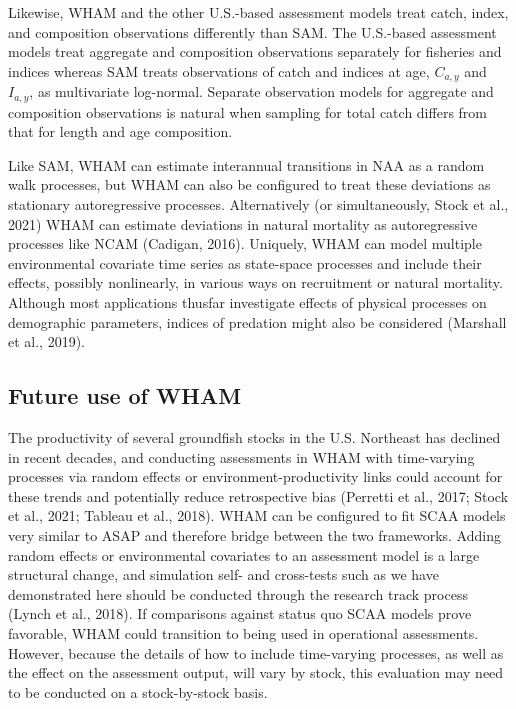 \documentclass[]{article}
\begin{document}
Likewise, WHAM and the other U.S.-based assessment models treat catch,
index, and composition observations differently than SAM. The U.S.-based
assessment models treat aggregate and composition observations
separately for fisheries and indices whereas SAM treats observations of
catch and indices at age, \(C_{a,y}\) and \(I_{a,y}\), as multivariate
log-normal. Separate observation models for aggregate and composition
observations is natural when sampling for total catch differs from that
for length and age composition.

Like SAM, WHAM can estimate interannual transitions in NAA as a random
walk processes, but WHAM can also be configured to treat these
deviations as stationary autoregressive processes. Alternatively (or
simultaneously, Stock et al., 2021) WHAM can estimate deviations in
natural mortality as autoregressive processes like NCAM (Cadigan, 2016).
Uniquely, WHAM can model multiple environmental covariate time series as
state-space processes and include their effects, possibly nonlinearly,
in various ways on recruitment or natural mortality. Although most
applications thusfar investigate effects of physical processes on
demographic parameters, indices of predation might also be considered
(Marshall et al., 2019).

\hypertarget{future-use-of-wham}{%
\subsection{Future use of WHAM}\label{future-use-of-wham}}

The productivity of several groundfish stocks in the U.S. Northeast has
declined in recent decades, and conducting assessments in WHAM with
time-varying processes via random effects or environment-productivity
links could account for these trends and potentially reduce
retrospective bias (Perretti et al., 2017; Stock et al., 2021; Tableau
et al., 2018). WHAM can be configured to fit SCAA models very similar to
ASAP and therefore bridge between the two frameworks. Adding random
effects or environmental covariates to an assessment model is a large
structural change, and simulation self- and cross-tests such as we have
demonstrated here should be conducted through the research track process
(Lynch et al., 2018). If comparisons against status quo SCAA models
prove favorable, WHAM could transition to being used in operational
assessments. However, because the details of how to include time-varying
processes, as well as the effect on the assessment output, will vary by
stock, this evaluation may need to be conducted on a stock-by-stock
basis.
\end{document}
